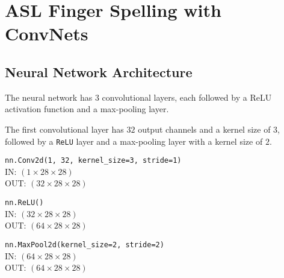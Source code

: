 \section{ASL Finger Spelling with ConvNets}

\subsection{Neural Network Architecture}

            







The neural network has $3$ convolutional layers, each followed by a
ReLU activation function and a max-pooling layer.

\begin{enumarabic}
  \item The first convolutional layer has $32$ output channels and a kernel size of $3$,
    followed by a \verb|ReLU| layer and a max-pooling layer with a kernel size of $2$.
    \begin{enumroman}
      \item \verb|nn.Conv2d(1, 32, kernel_size=3, stride=1)| \\
        IN: $(1 \times 28 \times 28)$ \\
        OUT: $(32 \times 28 \times 28)$
      \item \verb|nn.ReLU()| \\
        IN: $(32 \times 28 \times 28)$ \\
        OUT: $(64 \times 28 \times 28)$
      \item \verb|nn.MaxPool2d(kernel_size=2, stride=2)| \\
        IN: $(64 \times 28 \times 28)$ \\
        OUT: $(64 \times 28 \times 28)$
    \end{enumroman}

\end{enumarabic}
